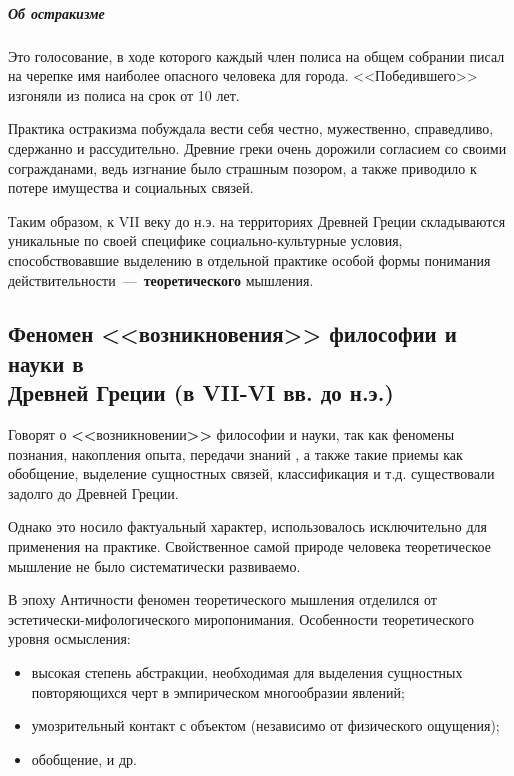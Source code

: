 \subparagraph{Об остракизме} Это голосование, в ходе которого каждый член полиса на общем собрании писал на черепке имя наиболее опасного человека для города. <<Победившего>> изгоняли из полиса на срок от 10 лет. 

Практика остракизма побуждала вести себя честно, мужественно, справедливо, сдержанно и рассудительно. Древние греки очень дорожили согласием со своими согражданами, ведь изгнание было страшным позором, а также приводило к потере имущества и социальных связей.


Таким образом, к VII веку до н.э. на территориях Древней Греции складываются уникальные по своей специфике социально-культурные условия, способствовавшие выделению в отдельной практике особой формы понимания действительности~---~\textbf{теоретического} мышления. 

\subsection{Феномен <<возникновения>> философии и науки в \\ Древней Греции (в VII-VI вв. до н.э.)}

Говорят о \textbf{\Large<<}возникновении\textbf{\Large>>} философии и науки, так как феномены познания, накопления опыта, передачи знаний , а также такие приемы как обобщение, выделение сущностных связей, классификация и т.д. существовали задолго до Древней Греции. 

Однако это носило фактуальный характер, использовалось исключительно для применения на практике. Свойственное самой природе человека теоретическое мышление не было
систематически развиваемо.

В эпоху Античности феномен теоретического мышления отделился от эстетически-мифологического миропонимания. Особенности теоретического уровня осмысления: 
\begin{itemize}
    \item высокая степень абстракции, необходимая для выделения сущностных повторяющихся черт в эмпирическом многообразии явлений;
    \item умозрительный контакт с объектом (независимо от физического ощущения);
    \item обобщение, и др.
\end{itemize}

